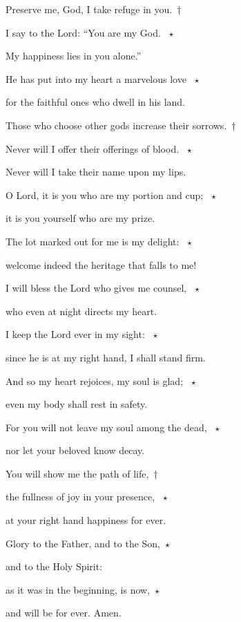 \noindent Preserve me, God, I take refuge in you.~†~\nopagebreak

I say to the Lord: “You are my God. ~$\star$~\nopagebreak

My happiness lies in you alone.”

\noindent He has put into my heart a marvelous love ~$\star$~\nopagebreak

for the faithful ones who dwell in his land.

\noindent Those who choose other gods increase their sorrows.~†~\nopagebreak

Never will I offer their offerings of blood. ~$\star$~\nopagebreak

Never will I take their name upon my lips.

\noindent O Lord, it is you who are my portion and cup; ~$\star$~\nopagebreak

it is you yourself who are my prize.

\noindent The lot marked out for me is my delight: ~$\star$~\nopagebreak

welcome indeed the heritage that falls to me!

\noindent I will bless the Lord who gives me counsel, ~$\star$~\nopagebreak

who even at night directs my heart.

\noindent I keep the Lord ever in my sight: ~$\star$~\nopagebreak

since he is at my right hand, I shall stand firm.

\noindent And so my heart rejoices, my soul is glad; ~$\star$~\nopagebreak

even my body shall rest in safety.

\noindent For you will not leave my soul among the dead, ~$\star$~\nopagebreak

nor let your beloved know decay.

\noindent You will show me the path of life,~†~\nopagebreak

the fullness of joy in your presence, ~$\star$~\nopagebreak

at your right hand happiness for ever.

\noindent Glory to the Father, and to the Son,~$\star$~\nopagebreak

and to the Holy Spirit:

\noindent as it was in the beginning, is now,~$\star$~\nopagebreak

and will be for ever. Amen.
